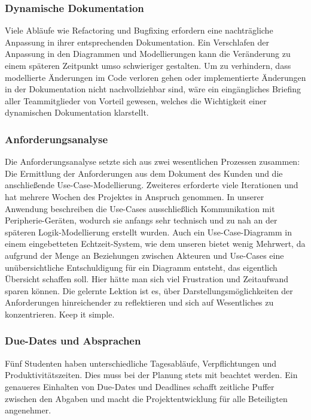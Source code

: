 \subsubsection{Dynamische Dokumentation}
Viele Abläufe wie Refactoring und Bugfixing erfordern eine nachträgliche Anpassung in ihrer entsprechenden
Dokumentation.
Ein Verschlafen der Anpassung in den Diagrammen und Modellierungen kann die Veränderung zu einem
späteren Zeitpunkt umso schwieriger gestalten.
Um zu verhindern, dass modellierte Änderungen im Code verloren gehen oder implementierte Änderungen
in der Dokumentation nicht nachvollziehbar sind, wäre ein eingängliches Briefing aller Teammitglieder von Vorteil
gewesen, welches die Wichtigkeit einer dynamischen Dokumentation klarstellt.

\subsubsection{Anforderungsanalyse}
Die Anforderungsanalyse setzte sich aus zwei wesentlichen Prozessen zusammen:
Die Ermittlung der Anforderungen aus dem Dokument des Kunden und die anschließende Use-Case-Modellierung.
Zweiteres erforderte viele Iterationen und hat mehrere Wochen des Projektes in Anspruch genommen.
In unserer Anwendung beschreiben die Use-Cases ausschließlich Kommunikation mit Peripherie-Geräten,
wodurch sie anfangs sehr technisch und zu nah an der späteren Logik-Modellierung erstellt wurden.
Auch ein Use-Case-Diagramm in einem eingebetteten Echtzeit-System, wie dem unseren bietet wenig Mehrwert,
da aufgrund der Menge an Beziehungen zwischen Akteuren und Use-Cases eine unübersichtliche Entschuldigung
für ein Diagramm entsteht, das eigentlich Übersicht schaffen soll.
Hier hätte man sich viel Frustration und Zeitaufwand sparen können.
Die gelernte Lektion ist es, über Darstellungsmöglichkeiten der Anforderungen hinreichender zu reflektieren
und sich auf Wesentliches zu konzentrieren.
Keep it simple.

\subsubsection{Due-Dates und Absprachen}
Fünf Studenten haben unterschiedliche Tagesabläufe, Verpflichtungen und Produktivitätszeiten.
Dies muss bei der Planung stets mit beachtet werden.
Ein genaueres Einhalten von Due-Dates und Deadlines schafft zeitliche Puffer zwischen den Abgaben
und macht die Projektentwicklung für alle Beteiligten angenehmer.


\subsubsection{}